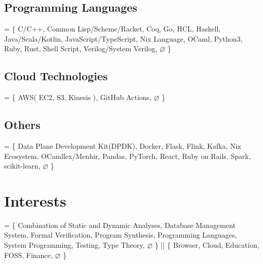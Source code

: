\documentclass[10pt]{article}
\begin{document}
  \subsection*{Programming Languages}
    = \{
      C/C++,
      Common Lisp/Scheme/Racket,
      Coq,
      Go,
      HCL,
      Haskell,
      Java/Scala/Kotlin,
      JavaScript/TypeScript,
      Nix Language,
      OCaml,
      Python3,
      Ruby,
      Rust,
      Shell Script,
      Verilog/System Verilog,
      $\varnothing$
    \}
  \subsection*{Cloud Technologies}
    = \{
      AWS(
        EC2,
        S3,
        Kinesis
      ),
      GitHub Actions,
      $\varnothing$
    \}
  \subsection*{Others}
    = \{
      Data Plane Development Kit(DPDK),
      Docker,
      Flask,
      Flink,
      Kafka,
      Nix Ecosystem,
      OCamllex/Menhir,
      Pandas,
      PyTorch,
      React,
      Ruby on Rails,
      Spark,
      scikit-learn,
      $\varnothing$
    \}

\section*{Interests}
  = \{
    Combination of Static and Dynamic Analyses,
    Database Management System,
    Formal Verification,
    Program Synthesis,
    Programming Languages,
    System Programming,
    Testing,
    Type Theory,
    $\varnothing$
  \}
  ||
  \{
    Browser,
    Cloud,
    Education,
    FOSS,
    Finance,
    $\varnothing$
  \}
\end{document}
